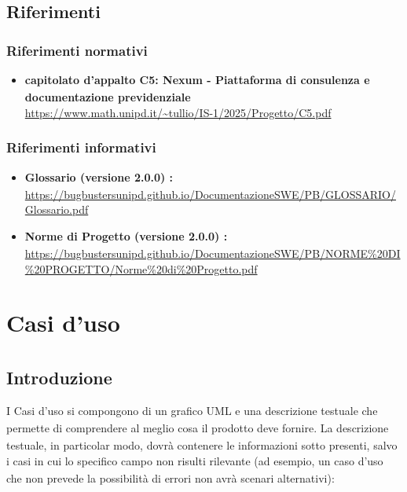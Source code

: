 ﻿\documentclass[a4paper,11pt]{article}
\begin{document}
\newpage

\subsection{Riferimenti}

\subsubsection{Riferimenti normativi}
\begin{itemize}
\item \textbf{capitolato\textsubscript{}
 d'appalto C5: Nexum - Piattaforma di consulenza e documentazione previdenziale}\\
\url{https://www.math.unipd.it/~tullio/IS-1/2025/Progetto/C5.pdf}
\end{itemize}

\subsubsection{Riferimenti informativi}
\begin{itemize}
\item \textbf{Glossario\textsubscript{} (versione 2.0.0)
:}\\
\url{https://bugbustersunipd.github.io/DocumentazioneSWE/PB/GLOSSARIO/Glossario.pdf}
\item \textbf{Norme di Progetto\textsubscript{} (versione 2.0.0)
:}\\
\url{https://bugbustersunipd.github.io/DocumentazioneSWE/PB/NORME%20DI%20PROGETTO/Norme%20di%20Progetto.pdf}
\end{itemize}



\section{Casi d'uso\textsubscript{}}
\subsection{Introduzione}
I Casi d'uso\textsubscript{} si compongono di un grafico UML e una descrizione testuale che permette di
comprendere al meglio cosa il prodotto\textsubscript{} deve fornire. La descrizione testuale, in particolar
modo, dovrà contenere le informazioni sotto presenti, salvo i casi in cui lo
specifico campo non risulti rilevante (ad esempio, un caso d'uso\textsubscript{} che non prevede la
possibilità di errori non avrà scenari alternativi):
\end{document}
